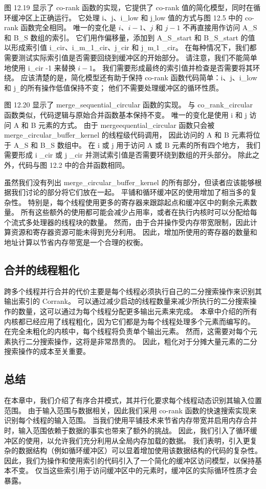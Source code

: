 图 12.19 显示了 co-rank 函数的实现，它提供了 co-rank 值的简化模型，同时在循环缓冲区上正确运行。 
它处理 $\mathrm{i}、\mathrm{j}$、i\_low 和 $\mathrm{j} \_$low 值的方式与图 12.5 中的 co-rank 函数完全相同。 
唯一的变化是 $i、i-1、j$ 和 $j-1$ 不再直接用作访问 A\_S 和 B\_S 数组的索引。 
它们用作偏移量，添加到 A\_S\_start 和 B\_S\_start 的值以形成索引值 i\_cir、i\_m\_1\_cir、$\mathrm{j}_{ -}$cir 和 $\mathrm{j}_{-} \mathrm{m} \_1$ \_cir。 
在每种情况下，我们都需要测试实际索引值是否需要回绕到缓冲区的开始部分。 
请注意，我们不能简单地使用 i\_cir -1 来替换 $i-1$。 我们需要形成最终的索引值并检查是否需要将其环绕。 
应该清楚的是，简化模型还有助于保持 co-rank 函数代码简单：$\mathrm{i}、\mathrm{j}$、i\_low 和 $\mathrm{j}_{-}$的所有操作低值保持不变； 他们不需要处理缓冲区的循环性质。

图 12.20 显示了 merge\_sequential\_circular 函数的实现。 
与 co\_rank\_circular 函数类似，代码逻辑与原始合并函数基本保持不变。 
唯一的变化是使用 $\mathrm{i}$ 和 $\mathrm{j}$ 访问 A 和 B 元素的方式。 
由于 mergeequential\_circular 函数只会被 merge\_circular\_buffer\_kernel 的线程级代码调用，
因此访问的 A 和 B 元素将位于 A\_S 和 B\_S 数组中。 
在 $\mathrm{i}$ 或 $\mathrm{j}$ 用于访问 A 或 $\mathrm{B}$ 元素的所有四个地方，
我们需要形成 $\mathrm{i}$ \_cir 或 $\mathrm{j}$ \_cir 并测试索引值是否需要环绕到数组的开头部分。 
除此之外，代码与图 12.2 中的合并函数相同。

虽然我们没有列出 merge\_circular\_buffer\_kernel 的所有部分，但读者应该能够根据我们讨论的部分将它们放在一起。 
平铺和循环缓冲区的使用增加了相当多的复杂性。 特别是，每个线程使用更多的寄存器来跟踪起点和缓冲区中的剩余元素数量。 
所有这些额外的使用都可能会减少占用率，或者在执行内核时可以分配给每个流式多处理器的线程块的数量。 
然而，由于合并操作受内存带宽限制，因此计算资源和寄存器资源可能未得到充分利用。 
因此，增加所使用的寄存器的数量和地址计算以节省内存带宽是一个合理的权衡。

\subsection{合并的线程粗化}
跨多个线程并行合并的代价主要是每个线程必须执行自己的二分搜索操作来识别其输出索引的 Corrank。 
可以通过减少启动的线程数量来减少所执行的二分搜索操作的数量，这可以通过为每个线程分配更多输出元素来完成。 
本章中介绍的所有内核都已经应用了线程粗化，因为它们都是为每个线程处理多个元素而编写的。 
在完全未粗化的内核中，每个线程将负责单个输出元素。 然而，这需要对每个元素执行二分搜索操作，这将是非常昂贵的。 
因此，粗化对于分摊大量元素的二分搜索操作的成本至关重要。

\subsection{总结}
在本章中，我们介绍了有序合并模式，其并行化要求每个线程动态识别其输入位置范围。 
由于输入范围与数据相关，因此我们采用 co-rank 函数的快速搜索实现来识别每个线程的输入范围。 
当我们使用平铺技术来节省内存带宽并启用内存合并时，输入范围依赖于数据的事实也带来了额外的挑战。 
因此，我们引入了循环缓冲区的使用，以允许我们充分利用从全局内存加载的数据。 
我们表明，引入更复杂的数据结构（例如循环缓冲区）可以显着增加使用该数据结构的代码的复杂性。 
因此，我们为操作和使用索引的代码引入了一个简化的缓冲区访问模型，以保持基本不变。 
仅当这些索引用于访问缓冲区中的元素时，缓冲区的实际循环性质才会暴露。